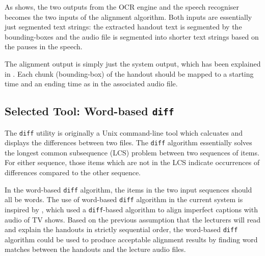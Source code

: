 As  shows, the two outputs from the OCR engine and the speech recogniser becomes the two inputs of the alignment algorithm. Both inputs are essentially just segmented text strings: the extracted handout text is segmented by the bounding-boxes and the audio file is segmented into shorter text strings based on the pauses in the speech.

The alignment output is simply just the system output, which has been explained in . Each chunk (bounding-box) of the handout should be mapped to a starting time and an ending time as in the associated audio file. 

\subsection{Selected Tool: Word-based \texttt{diff}}

The \texttt{diff} utility is originally a Unix command-line tool which calcuates and displays the differences between two files. The \texttt{diff} algorithm essentially solves the longest common subsequence (LCS) problem between two sequences of items. For either sequence, those items which are not in the LCS indicate occurrences of differences compared to the other sequence.

In the word-based \texttt{diff} algorithm, the items in the two input sequences should all be words. The use of word-based \texttt{diff} algorithm in the current system is inspired by \cite{lanchantin2015development}, which used a \texttt{diff}-based algorithm to align imperfect captions with audio of TV shows. Based on the previous assumption that the lecturers will read and explain the handouts in strictly sequential order, the word-based \texttt{diff} algorithm could be used to produce acceptable alignment results by finding word matches between the handouts and the lecture audio files. 










